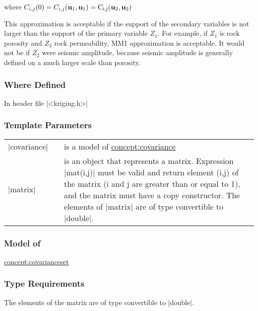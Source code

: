 \documentclass[12pt,twoside]{report}
\newcommand{\mloc}[1]{\rm{\bf #1}}
\begin{document}
\noindent where $C_{i,j}(0) = C_{i,j}(\mloc{u}_1,\mloc{u}_1) = C_{i,j}(\mloc{u}_2,\mloc{u}_2)$ 

This approximation is acceptable if the support of the secondary variables is not larger than the support of the primary variable $Z_1$. For example, if $Z_1$ is rock  porosity and $Z_2$ rock permeability, MM1 approximation is acceptable. It would not be if $Z_2$ were seismic amplitude, because seismic amplitude is generally defined on a much larger scale than porosity.


\htmlrule[CLEAR=all]  \subsubsection*{Where Defined}
In header file |<kriging.h>|

\htmlrule[CLEAR=all]  \subsubsection*{Template Parameters}
\begin{tabular}[!h]{l l p{10cm}}
|covariance| & & is a model of \hyperref{Covariance}{Covariance}{}{concept:covariance}\\
|matrix| & & is an object that represents a matrix. Expression |mat(i,j)| must be valid and return element (i,j) of the matrix (i and j are greater than or equal to 1), and the matrix must have a copy constructor. The elements of |matrix| are of type convertible to |double|.\\
\end{tabular}


\htmlrule[CLEAR=all]  \subsubsection*{Model of}
\hyperref{Covariance Set}{Covariance Set}{}{concept:covarianceset}

\htmlrule[CLEAR=all]  \subsubsection*{Type Requirements}
The elements of the matrix are of type convertible to |double|.
\end{document}

